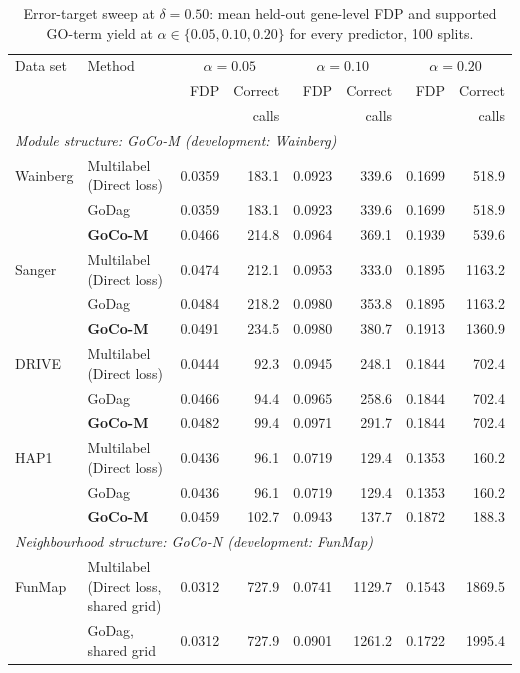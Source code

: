 \begin{table}[!t]
\centering
\caption{Error-target sweep at $\delta=0.50$: mean held-out gene-level FDP and supported GO-term yield at $\alpha\in\{0.05,0.10,0.20\}$ for every predictor, 100 splits.}
\label{tab:sweep50}
\scriptsize
\begin{tabular}{ll rr rr rr}
\toprule
Data set & Method & \multicolumn{2}{c}{$\alpha=0.05$} & \multicolumn{2}{c}{$\alpha=0.10$} & \multicolumn{2}{c}{$\alpha=0.20$} \\
 & & FDP & Correct & FDP & Correct & FDP & Correct \\
 & & & calls & & calls & & calls \\ \midrule
\multicolumn{8}{l}{\emph{Module structure: GoCo-M (development: Wainberg)}} \\
Wainberg & Multilabel (Direct loss) & 0.0359 & 183.1 & 0.0923 & 339.6 & 0.1699 & 518.9 \\
 & GoDag & 0.0359 & 183.1 & 0.0923 & 339.6 & 0.1699 & 518.9 \\
 & \textbf{GoCo-M} & 0.0466 & 214.8 & 0.0964 & 369.1 & 0.1939 & 539.6 \\
\addlinespace[2pt]
Sanger & Multilabel (Direct loss) & 0.0474 & 212.1 & 0.0953 & 333.0 & 0.1895 & 1163.2 \\
 & GoDag & 0.0484 & 218.2 & 0.0980 & 353.8 & 0.1895 & 1163.2 \\
 & \textbf{GoCo-M} & 0.0491 & 234.5 & 0.0980 & 380.7 & 0.1913 & 1360.9 \\
\addlinespace[2pt]
DRIVE & Multilabel (Direct loss) & 0.0444 & 92.3 & 0.0945 & 248.1 & 0.1844 & 702.4 \\
 & GoDag & 0.0466 & 94.4 & 0.0965 & 258.6 & 0.1844 & 702.4 \\
 & \textbf{GoCo-M} & 0.0482 & 99.4 & 0.0971 & 291.7 & 0.1844 & 702.4 \\
\addlinespace[2pt]
HAP1 & Multilabel (Direct loss) & 0.0436 & 96.1 & 0.0719 & 129.4 & 0.1353 & 160.2 \\
 & GoDag & 0.0436 & 96.1 & 0.0719 & 129.4 & 0.1353 & 160.2 \\
 & \textbf{GoCo-M} & 0.0459 & 102.7 & 0.0943 & 137.7 & 0.1872 & 188.3 \\
\midrule
\multicolumn{8}{l}{\emph{Neighbourhood structure: GoCo-N (development: FunMap)}} \\
FunMap & Multilabel (Direct loss, shared grid) & 0.0312 & 727.9 & 0.0741 & 1129.7 & 0.1543 & 1869.5 \\
 & GoDag, shared grid & 0.0312 & 727.9 & 0.0901 & 1261.2 & 0.1722 & 1995.4 \\

\end{tabular}
\end{table}
